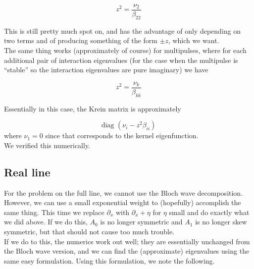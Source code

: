 \documentclass[12pt]{article}
\begin{document}
\[
z^2 = \frac{\nu_2}{\beta_{22}}
\]


This is still pretty much spot on, and has the advantage of only depending on two terms and of producing something of the form $\pm z$, which we want.\\

The same thing works (approximately of course) for multipulses, where for each additional pair of interaction eigenvalues (for the case when the multipulse is ``stable'' so the interaction eigenvalues are pure imaginary) we have

\[
z^2 = \frac{\nu_k}{\beta_{kk}}
\]

Essentially in this case, the Krein matrix is approximately

\[
\text{diag }( \nu_i  - z^2 \beta_{ii})
\]
where $\nu_1 = 0$ since that corresponds to the kernel eigenfunction.\\

We verified this numerically.\\

\subsection*{Real line}

For the problem on the full line, we cannot use the Bloch wave decomposition. However, we can use a small exponential weight to (hopefully) accomplish the same thing. This time we replace $\partial_x$ with $\partial_x + \eta$ for $\eta$ small and do exactly what we did above. If we do this, $A_0$ is no longer symmetric and $A_1$ is no longer skew symmetric, but that should not cause too much trouble.\\

If we do to this, the numerics work out well; they are essentially unchanged from the Bloch wave version, and we can find the (approximate) eigenvalues using the same easy formulation. Using this formulation, we note the following.
\end{document}
